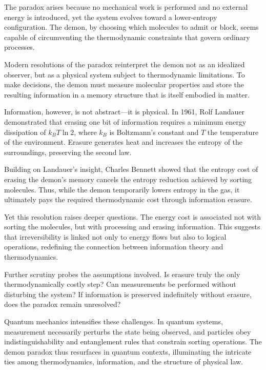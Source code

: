 The paradox arises because no mechanical work is performed and no external energy is introduced, yet the system evolves toward a lower-entropy configuration. The demon, by choosing which molecules to admit or block, seems capable of circumventing the thermodynamic constraints that govern ordinary processes.

Modern resolutions of the paradox reinterpret the demon not as an idealized observer, but as a physical system subject to thermodynamic limitations. To make decisions, the demon must measure molecular properties and store the resulting information in a memory structure that is itself embodied in matter.

Information, however, is not abstract—it is physical. In 1961, Rolf Landauer demonstrated that erasing one bit of information requires a minimum energy dissipation of $k_B T \ln 2$, where $k_B$ is Boltzmann’s constant and $T$ the temperature of the environment. Erasure generates heat and increases the entropy of the surroundings, preserving the second law.

Building on Landauer’s insight, Charles Bennett showed that the entropy cost of erasing the demon’s memory cancels the entropy reduction achieved by sorting molecules. Thus, while the demon temporarily lowers entropy in the gas, it ultimately pays the required thermodynamic cost through information erasure.

Yet this resolution raises deeper questions. The energy cost is associated not with sorting the molecules, but with processing and erasing information. This suggests that irreversibility is linked not only to energy flows but also to logical operations, redefining the connection between information theory and thermodynamics.

Further scrutiny probes the assumptions involved. Is erasure truly the only thermodynamically costly step? Can measurements be performed without disturbing the system? If information is preserved indefinitely without erasure, does the paradox remain unresolved?

Quantum mechanics intensifies these challenges. In quantum systems, measurement necessarily perturbs the state being observed, and particles obey indistinguishability and entanglement rules that constrain sorting operations. The demon paradox thus resurfaces in quantum contexts, illuminating the intricate ties among thermodynamics, information, and the structure of physical law.


